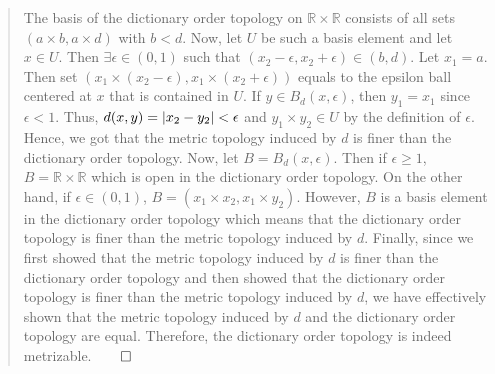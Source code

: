 \documentclass[12pt, a4paper]{article}
\newcommand{\reals}{\mathbb{R}} %
\DeclarePairedDelimiter\abs{\lvert}{\rvert}
\begin{document}
\begin{itemize}
\begin{quote}
\item[]
\item[]

The basis of the dictionary order topology on $\reals \times \reals$
consists of all sets $(a \times b, a \times d)$ with $b < d$. Now, let $U$ be such a basis element and let $x \in U$.
Then $\exists \epsilon \in (0, 1)$ such that $(x_2 - \epsilon, x_2 + \epsilon) \in (b, d)$.
Let $x_1 = a$. Then set $(x_1 \times (x_2 - \epsilon), x_1 \times (x_2 + \epsilon))$ equals to the epsilon ball centered
at $x$ that is contained in $U$. If $y \in B_d(x, \epsilon)$, then $y_1 = x_1$ since $\epsilon < 1$. Thus, $d(x, y) = \abs{x_2 - y_2} < \epsilon$
and $y_1 \times y_2 \in U$ by the definition of $\epsilon$. Hence, we got that the metric topology induced by $d$ is finer than
the dictionary order topology.
\newline
\newline
Now, let $B = B_d(x, \epsilon)$. Then if $\epsilon \geq 1$, $B = \reals \times \reals$ which is open in the dictionary order topology.
On the other hand, if $\epsilon \in (0, 1)$, $B = (x_1 \times x_2, x_1 \times y_2)$. However, $B$ is a basis element in the dictionary order
topology which means that the dictionary order topology is finer than the metric topology induced by $d$.
\newline
\newline
Finally, since we first showed that the metric topology induced by $d$ is finer than the dictionary order topology
and then showed that the dictionary order topology is finer than the metric topology induced by $d$, we have effectively
shown that the metric topology induced by $d$ and the dictionary order topology are equal. Therefore, the dictionary order topology is indeed metrizable.$\qed$ 
\end{quote}

\item[]
\item[]


\end{itemize}
\end{document}
